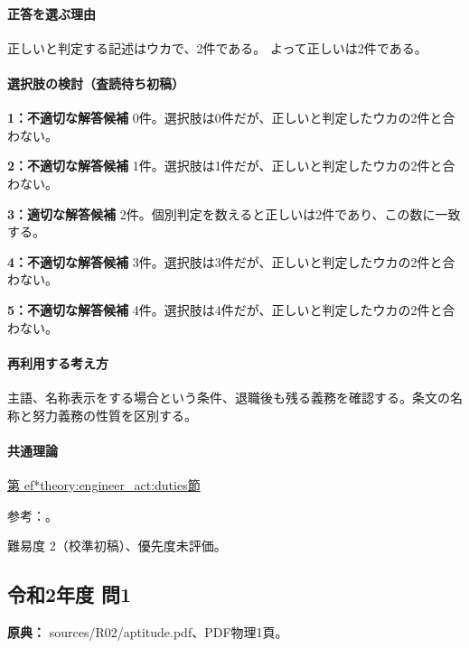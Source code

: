 \paragraph{正答を選ぶ理由} 正しいと判定する記述はウカで、2件である。  よって正しいは2件である。

\paragraph{選択肢の検討（査読待ち初稿）}

\noindent\textbf{1：不適切な解答候補} 0件。選択肢は0件だが、正しいと判定したウカの2件と合わない。\par

\noindent\textbf{2：不適切な解答候補} 1件。選択肢は1件だが、正しいと判定したウカの2件と合わない。\par

\noindent\textbf{3：適切な解答候補} 2件。個別判定を数えると正しいは2件であり、この数に一致する。\par

\noindent\textbf{4：不適切な解答候補} 3件。選択肢は3件だが、正しいと判定したウカの2件と合わない。\par

\noindent\textbf{5：不適切な解答候補} 4件。選択肢は4件だが、正しいと判定したウカの2件と合わない。\par

\paragraph{再利用する考え方} 主語、名称表示をする場合という条件、退職後も残る義務を確認する。条文の名称と努力義務の性質を区別する。

\paragraph{共通理論} \hyperref[theory:engineer_act:duties]{第
ef*{theory:engineer_act:duties}節}

\par 参考：\cite{engineer_act_current}。

\par 難易度 2（校準初稿）、優先度未評価。

\subsection{令和2年度 問1}
\label{q:r02-reg-apt-01}

\noindent\textbf{原典：} sources/R02/aptitude.pdf、PDF物理1頁。

